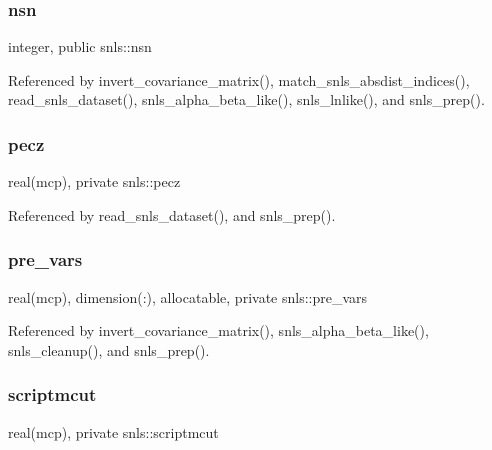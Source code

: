 \subsubsection{\texorpdfstring{nsn}{nsn}}
{\footnotesize\ttfamily integer, public snls\+::nsn}



Referenced by invert\+\_\+covariance\+\_\+matrix(), match\+\_\+snls\+\_\+absdist\+\_\+indices(), read\+\_\+snls\+\_\+dataset(), snls\+\_\+alpha\+\_\+beta\+\_\+like(), snls\+\_\+lnlike(), and snls\+\_\+prep().

\mbox{\label{namespacesnls_a01a9c6e8b04129b6a2c1b9bbd4cd6cc9}} 
\subsubsection{\texorpdfstring{pecz}{pecz}}
{\footnotesize\ttfamily real(mcp), private snls\+::pecz\hspace{0.3cm}{\ttfamily [private]}}



Referenced by read\+\_\+snls\+\_\+dataset(), and snls\+\_\+prep().

\mbox{\label{namespacesnls_a3a2029fb54b5f14f48f328a2b9cf9d98}} 
\subsubsection{\texorpdfstring{pre\+\_\+vars}{pre\_vars}}
{\footnotesize\ttfamily real(mcp), dimension(\+:), allocatable, private snls\+::pre\+\_\+vars\hspace{0.3cm}{\ttfamily [private]}}



Referenced by invert\+\_\+covariance\+\_\+matrix(), snls\+\_\+alpha\+\_\+beta\+\_\+like(), snls\+\_\+cleanup(), and snls\+\_\+prep().

\mbox{\label{namespacesnls_ac747536aeed92aaeab54e9366afeefd2}} 
\subsubsection{\texorpdfstring{scriptmcut}{scriptmcut}}
{\footnotesize\ttfamily real(mcp), private snls\+::scriptmcut\hspace{0.3cm}{\ttfamily [private]}}



